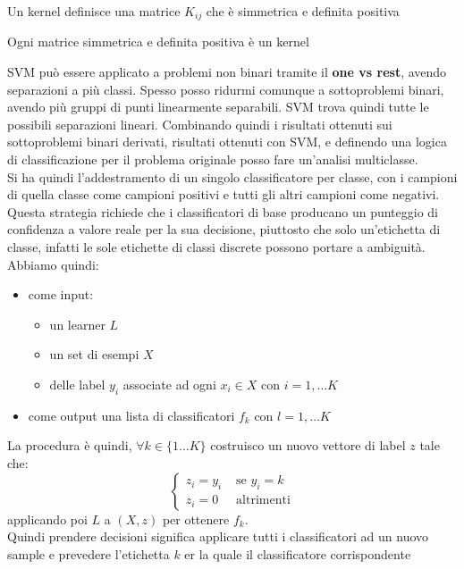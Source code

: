 \documentclass[a4paper,12pt, oneside]{book}
\begin{document}
\begin{teorema}
  Un kernel definisce una matrice $K_{ij}$ che è simmetrica e definita positiva
\end{teorema}
\begin{teorema}
  Ogni matrice simmetrica e definita positiva è un kernel
\end{teorema}
SVM può essere applicato a problemi non binari tramite il \textbf{one vs rest},
avendo separazioni a più classi. Spesso posso ridurmi comunque a sottoproblemi
binari, avendo più gruppi di punti linearmente separabili. SVM trova quindi
tutte le possibili separazioni lineari. Combinando quindi i risultati ottenuti
sui sottoproblemi binari derivati, risultati ottenuti con SVM, e definendo una
logica di classificazione per il problema originale posso fare un'analisi
multiclasse.\\
Si ha quindi l'addestramento di un singolo classificatore per classe, con i
campioni di quella classe come campioni positivi e tutti gli altri campioni come
negativi.\\
Questa strategia richiede che i classificatori di base producano un punteggio di
confidenza a valore reale per la sua decisione, piuttosto che solo un'etichetta
di classe, infatti le sole etichette di classi discrete possono portare a
ambiguità.
\newpage
Abbiamo quindi:
\begin{itemize}
  \item come input:
  \begin{itemize}
    \item un learner $L$
    \item un set di esempi $X$
    \item delle label $y_i$ associate ad ogni $x_i\in X$ con $i=1,\ldots K$
  \end{itemize}
  \item come output una lista di classificatori $f_k$ con $l=1,\ldots K$
\end{itemize}
La procedura è quindi, $\forall k\in \{1\ldots K\}$ costruisco un nuovo vettore
di label $z$ tale che:
\[
  \begin{cases}
    z_i=y_i&\mbox{ se } y_i=k\\
    z_i=0&\mbox{ altrimenti}
  \end{cases}
\]
applicando poi $L$ a $(X,z)$ per ottenere $f_k$.\\
Quindi prendere decisioni significa applicare tutti i classificatori ad un nuovo
sample e prevedere l'etichetta $k$ er la quale il classificatore corrispondente
\end{document}
